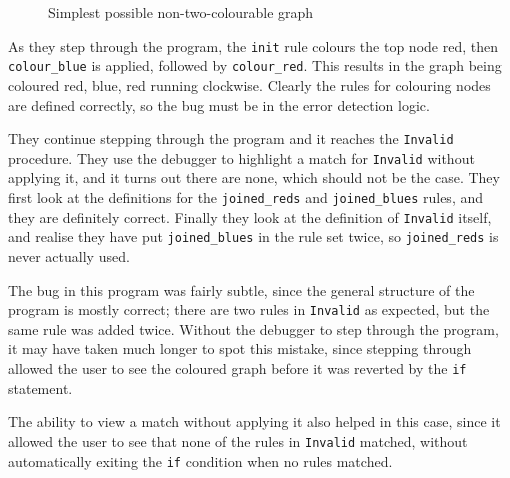 \documentclass[authoryearcitations]{UoYCSproject}
\newenvironment{nscenter}
    {\parskip=0pt\par\nopagebreak\centering}
    {\par\noindent\ignorespacesafterend}
\begin{document}
\begin{figure}
    \begin{framed}
        \begin{nscenter}
        \end{nscenter}
    \end{framed}
    \caption{Simplest possible non-two-colourable graph}
    \label{fig:SimplestNonTwoColourableGraph}
\end{figure}

As they step through the program, the \texttt{init} rule colours the top node red,
then \texttt{colour\_blue} is applied, followed by \texttt{colour\_red}. This results
in the graph being coloured red, blue, red running clockwise. Clearly the rules
for colouring nodes are defined correctly, so the bug must be in the error
detection logic.

They continue stepping through the program and it reaches the \texttt{Invalid}
procedure. They use the debugger to highlight a match for \texttt{Invalid}
without applying it, and it turns out there are none, which should not be the
case. They first look at the definitions for the \texttt{joined\_reds} and
\texttt{joined\_blues} rules, and they are definitely correct. Finally they look
at the definition of \texttt{Invalid} itself, and realise they have put
\texttt{joined\_blues} in the rule set twice, so \texttt{joined\_reds} is never
actually used.

The bug in this program was fairly subtle, since the general structure of the
program is mostly correct; there are two rules in \texttt{Invalid} as expected,
but the same rule was added twice. Without the debugger to step through the
program, it may have taken much longer to spot this mistake, since stepping
through allowed the user to see the coloured graph before it was reverted by
the \texttt{if} statement.

The ability to view a match without applying it also helped in this case, since
it allowed the user to see that none of the rules in \texttt{Invalid} matched,
without automatically exiting the \texttt{if} condition when no rules matched.
\end{document}
